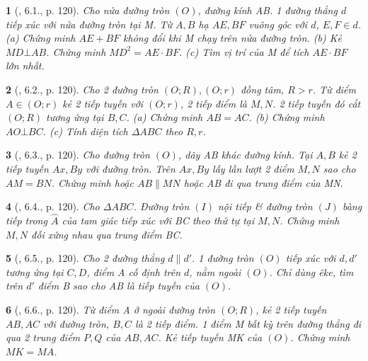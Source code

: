 \documentclass{article}
\newtheorem{baitoan}{}
\begin{document}
\begin{baitoan}[\cite{Binh_boi_duong_Toan_9_tap_1}, 6.1., p. 120]
	Cho nửa đường tròn $(O)$, đường kính AB. 1 đường thẳng $d$ tiếp xúc với nửa đường tròn tại M. Từ $A,B$ hạ $AE,BF$ vuông góc với $d$, $E,F\in d$. (a) Chứng minh $AE + BF$ không đổi khi M chạy trên nửa đường tròn. (b) Kẻ $MD\bot AB$. Chứng minh $MD^2 = AE\cdot BF$. (c) Tìm vị trí của M để tích $AE\cdot BF$ lớn nhất.
\end{baitoan}

\begin{baitoan}[\cite{Binh_boi_duong_Toan_9_tap_1}, 6.2., p. 120]
	Cho 2 đường tròn $(O;R),(O;r)$ đồng tâm, $R > r$. Từ điểm $A\in(O;r)$ kẻ 2 tiếp tuyến với $(O;r)$, 2 tiếp điểm là $M,N$. 2 tiếp tuyến đó cắt $(O;R)$ tương ứng tại $B,C$. (a) Chứng minh $AB = AC$. (b) Chứng minh $AO\bot BC$. (c) Tính diện tích $\Delta ABC$ theo $R,r$.
\end{baitoan}

\begin{baitoan}[\cite{Binh_boi_duong_Toan_9_tap_1}, 6.3., p. 120]
	Cho đường tròn $(O)$, dây AB khác đường kính. Tại $A,B$ kẻ 2 tiếp tuyến $Ax,By$ với đường tròn. Trên $Ax,By$ lấy lần lượt 2 điểm $M,N$ sao cho $AM = BN$. Chứng minh hoặc $AB\parallel MN$ hoặc AB đi qua trung điểm của MN.
\end{baitoan}

\begin{baitoan}[\cite{Binh_boi_duong_Toan_9_tap_1}, 6.4., p. 120]
	Cho $\Delta ABC$. Đường tròn $(I)$ nội tiếp \& đường tròn $(J)$ bàng tiếp trong $\widehat{A}$ của tam giác tiếp xúc với BC theo thứ tự tại $M,N$. Chứng minh $M,N$ đối xứng nhau qua trung điểm BC.
\end{baitoan}

\begin{baitoan}[\cite{Binh_boi_duong_Toan_9_tap_1}, 6.5., p. 120]
	Cho 2 đường thẳng $d\parallel d'$. 1 đường tròn $(O)$ tiếp xúc với $d,d'$ tương ứng tại $C,D$, điểm A cố định trên $d$, nằm ngoài $(O)$. Chỉ dùng êke, tìm trên $d'$ điểm B sao cho AB là tiếp tuyến của $(O)$.
\end{baitoan}

\begin{baitoan}[\cite{Binh_boi_duong_Toan_9_tap_1}, 6.6., p. 120]
	Từ điểm A ở ngoài đường tròn $(O;R)$, kẻ 2 tiếp tuyến $AB,AC$ với đường tròn, $B,C$ là 2 tiếp điểm. 1 điểm M bất kỳ trên đường thẳng đi qua 2 trung điểm $P,Q$ của $AB,AC$. Kẻ tiếp tuyến MK của $(O)$. Chứng minh $MK = MA$.
\end{baitoan}
\end{document}

